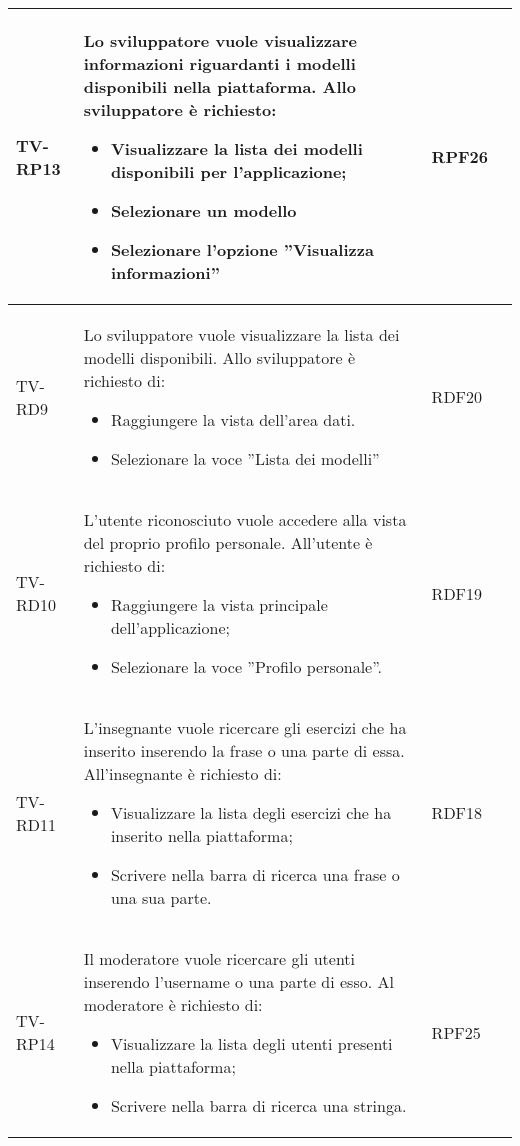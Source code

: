 \begin{longtable}{|>{\centering\arraybackslash}m{1.6cm}|>{\centering\arraybackslash}m{6.41cm}|>{\centering\arraybackslash}m{3.1cm} | >{\centering\arraybackslash}m{2.6cm}|}
 TV-RP13 & Lo sviluppatore vuole visualizzare informazioni riguardanti i modelli disponibili nella piattaforma. Allo sviluppatore è richiesto:
 \begin{itemize}
  \item  Visualizzare la lista dei modelli disponibili per l’applicazione;
  \item Selezionare un modello
  \item Selezionare l’opzione ”Visualizza informazioni”
 \end{itemize}  & RPF26 \\ \hline

\rowcolor{LightGray}
TV-RD9 & Lo sviluppatore vuole visualizzare la lista dei modelli disponibili.  Allo sviluppatore è richiesto di:

\begin{itemize}
 \item Raggiungere la vista dell’area dati.
 \item Selezionare la voce ”Lista dei modelli”
\end{itemize}  & RDF20 \\ \hline

TV-RD10 & L’utente riconosciuto vuole accedere alla vista del proprio profilo personale. All'utente è richiesto di:
\begin{itemize}
  \item Raggiungere la vista principale dell'applicazione;
 \item Selezionare la voce ”Profilo personale”.
\end{itemize}  & RDF19 \\ \hline

\rowcolor{LightGray}
TV-RD11 & L’insegnante vuole ricercare gli esercizi che ha inserito inserendo la frase o una parte di essa. All'insegnante è richiesto di:


\begin{itemize}
 \item Visualizzare la lista degli esercizi che ha inserito nella piattaforma;
 \item Scrivere nella barra di ricerca una frase o una sua parte.
\end{itemize}  & RDF18 \\ \hline

TV-RP14 & Il moderatore vuole ricercare gli utenti inserendo l’username o una parte di esso. Al moderatore è richiesto di:
\begin{itemize}
 \item Visualizzare la lista degli utenti presenti nella piattaforma;
 \item Scrivere nella barra di ricerca una stringa.
\end{itemize}  & RPF25 \\ \hline


\end{longtable}
